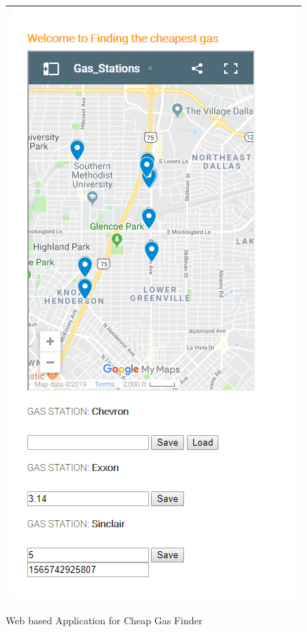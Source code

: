 \documentclass[conference]{IEEEtran}
\begin{document}
\begin{figure}[h] %
\begin{tabular}{| p{}|}
\hline
\begin{center}
\includegraphics[scale=.35]{../graphics/WebApp.png}
\end{center}
\\
\hline
\end{tabular}	
	\caption{Web based Application for Cheap Gas Finder}
	\label{fig:WebApp}
\end{figure} 
\end{document}
